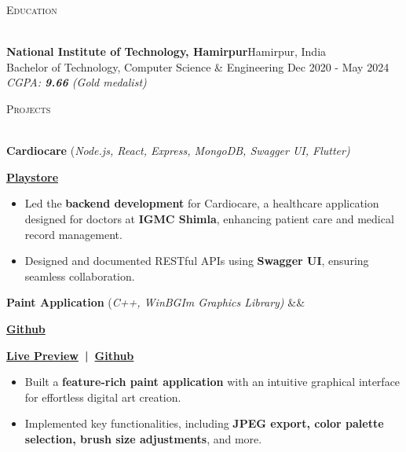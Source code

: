 \documentclass[a4paper]{article}
\newcommand{\tinyBulletSep} { \vspace{2mm} }
\newcommand{\bulletSep} { \vspace{2.5mm} }
\newcommand{\sectionSep} { \vspace{3mm} }
\newcommand{\lineunder} {
    \vspace*{-8pt} \\
    \hspace*{-15pt} \hrulefill \\
}
\newcommand{\header} [1] {
    {\hspace*{-18pt}\vspace*{6pt} {
        \fontfamily{qcs}\selectfont \large \scshape #1
    }}
    \vspace*{-6pt} \lineunder
    \vspace{1.1mm}
}
\newcommand{\educationItem}[6]{
    \textbf{#1}\hfill #2\\
    #3 \hfill #5\\
    \textit{#4}\\
    #6
}
\newcommand{\linkFont}[1]{
    \textbf{#1}
}
\newcommand{\link}[2]{
    \href{#1}{\textbf{#2}}
}
\newcommand{\projectItem}[5]{
    {\textbf{#1}} {(\sl #2)}\hfill
    \ifx&#3&%
    \link{#4}{Github}\\
    \else
    \linkFont{\href{#3}{Live Preview}~|~\href{#4}{Github}}\\
    \fi
    \vspace{2pt}
    \begin{itemize}
        #5
    \end{itemize}
}
\newcommand{\playstoreProjectItem}[4]{
    {\textbf{#1}} {(\sl #2)}\hfill
    \linkFont{\href{#3}{Playstore}}\\
    \vspace{2pt}
    \begin{itemize}
        #4
    \end{itemize}
}
\begin{document}
\header{Education}

\educationItem{National Institute of Technology, Hamirpur}{Hamirpur, India}{Bachelor of Technology, Computer Science \& Engineering}{CGPA: \textbf{9.66} (Gold medalist)}{Dec 2020 - May 2024}{

}


\sectionSep


\header{Projects}

\playstoreProjectItem{Cardiocare}{Node.js, React, Express, MongoDB, Swagger UI, Flutter}{https://play.google.com/store/apps/details?id=com.cardio.care}{
    \item Led the \textbf{backend development} for Cardiocare, a healthcare application designed for doctors at \textbf{IGMC Shimla}, enhancing patient care and medical record management.
    \item Designed and documented RESTful APIs using \textbf{Swagger UI}, ensuring seamless collaboration.
}
\bulletSep


\projectItem{Paint Application}{C++, WinBGIm Graphics Library}{}{https://github.com/Sahil-187/Paint-Application}{
    \item Built a \textbf{feature-rich paint application} with an intuitive graphical interface for effortless digital art creation.
    \item Implemented key functionalities, including \textbf{JPEG export, color palette selection, brush size adjustments}, and more.
}
\end{document}
